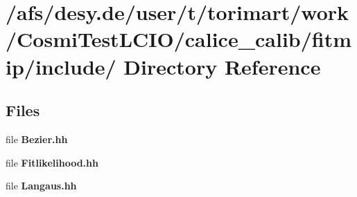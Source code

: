 \section{/afs/desy.de/user/t/torimart/work/CosmiTestLCIO/calice\_\-calib/fitmip/include/ Directory Reference}
\label{dir_a6f1c71feca9fe1ce77867768a90757d}
\subsection*{Files}
\begin{DoxyCompactItemize}
\item 
file {\bfseries Bezier.hh}
\item 
file {\bfseries Fitlikelihood.hh}
\item 
file {\bfseries Langaus.hh}
\end{DoxyCompactItemize}
